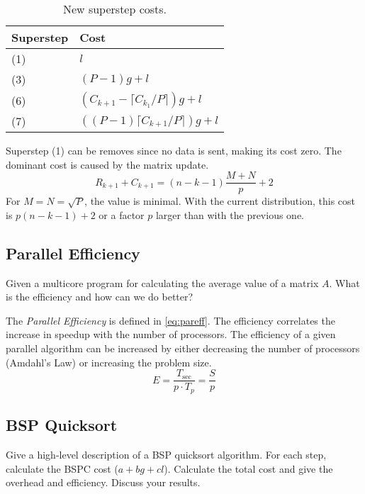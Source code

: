 \documentclass[../main.tex]{subfiles}
\begin{document}
\begin{solution}
\begin{enumerate}
\begin{table}[H]
\begin{tabular}{ll}
		\toprule
		Superstep & Cost  \\
		\midrule
		(1) & $l$ \\
		(3) & $(P-1)g+l$ \\
		(6) & $(C_{k+1} - \lceil C_{k_1}/P  \rceil )g + l$ \\
		(7) & $((P-1) \lceil C_{k+1}/P \rceil )g + l$\\
		\bottomrule
	\end{tabular}
	\caption{New superstep costs.}
	\label{tbl:lucost}
	\end{table}
	Superstep (1) can be removes since no data is sent, making its cost zero. The dominant cost is caused by the matrix update.
	\begin{equation}
		R_{k+1} + C_{k+1} = (n-k-1) \frac{M+N}{p} + 2
	\end{equation}
	For $M = N = \sqrt{P}$, the value is minimal. With the current distribution, this cost is $p (n-k-1) + 2$ or a factor $p$ larger than with the previous one.
\end{enumerate}
\end{solution}

\subsection{Parallel Efficiency}
\begin{question}
Given a multicore program for calculating the average value of a matrix $A$. What is the efficiency and how can we do
better?
\end{question}
\begin{solution} The \emph{Parallel Efficiency} is defined in \autoref{eq:pareff}. The efficiency correlates the
increase in speedup with the number of processors. The efficiency of a given parallel algorithm can be increased by
either decreasing the number of processors (Amdahl's Law) or increasing the problem size.
\begin{equation}\label{eq:pareff}
	E = \frac{T_\text{sec}}{p \cdot T_p} = \frac{S}{p}
\end{equation}
\end{solution}

\subsection{BSP Quicksort}
\begin{question}
Give a high-level description of a BSP quicksort algorithm. For each step, calculate the BSPC cost ($a + bg + cl$).
Calculate the total cost and give the overhead and efficiency. Discuss your results.
\end{question}
\begin{solution}
\end{solution}
\end{document}
